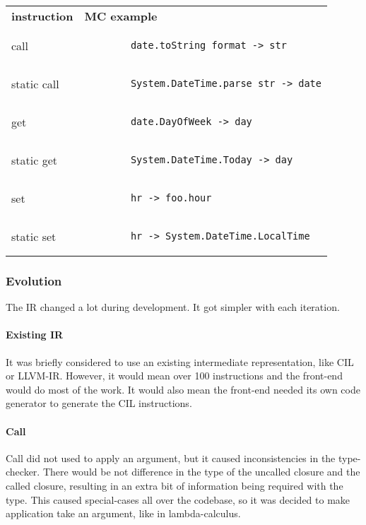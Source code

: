 \begin{tabular}{ll}
    \textbf{instruction} & \textbf{MC example}\\
    call & \begin{lstlisting}
        date.toString format -> str
    \end{lstlisting}\\

    static call & \begin{lstlisting}
        System.DateTime.parse str -> date
    \end{lstlisting}\\

    get & \begin{lstlisting}
        date.DayOfWeek -> day
    \end{lstlisting}\\

    static get & \begin{lstlisting}
        System.DateTime.Today -> day
    \end{lstlisting}\\

    set & \begin{lstlisting}
        hr -> foo.hour
    \end{lstlisting}\\

    static set & \begin{lstlisting}
        hr -> System.DateTime.LocalTime
    \end{lstlisting}\\ 
\end{tabular}

\subsubsection{Evolution}
The IR changed a lot during development.
It got simpler with each iteration.

\paragraph{Existing IR} It was briefly considered to use an existing intermediate representation, like CIL or LLVM-IR.
However, it would mean over 100 instructions and the front-end would do most of the work.
It would also mean the front-end needed its own code generator to generate the CIL instructions.

\paragraph{Call} Call did not used to apply an argument, but it caused inconsistencies in the type-checker.
There would be not difference in the type of the uncalled closure and the called closure, resulting in an extra bit of information being required with the type.
This caused special-cases all over the codebase, so it was decided to make application take an argument, like in lambda-calculus.

